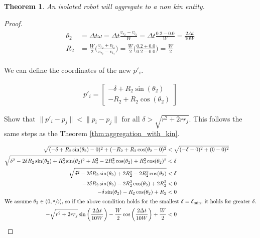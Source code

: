 \documentclass[conference]{IEEEtran}
\newtheorem{theorem}{Theorem}
\begin{document}
  \begin{theorem} \label{thm:aggregation_with_non_kin}
    An isolated robot will aggregate to a non kin entity.
  \end{theorem}
  \begin{proof}
    \begin{align}
      \begin{split} \label{eq:non_kin_theta_and_r}
        \theta_2 &= \Delta t\omega = \Delta t \frac{v_{r_2} - v_{l_2}}{W} = \Delta t \frac{0.2 - 0.0}{W} = \frac{2\Delta t}{10W} \\
        R_2 &= \frac{W}{2}\bigg(\frac{v_{r_2} + v_{l_2}}{v_{r_2} - v_{l_2}}\bigg) = \frac{W}{2}\bigg(\frac{0.2 + 0.0}{0.2 - 0.0}\bigg) = \frac{W}{2}
      \end{split}
    \end{align}

    We can define the coordinates of the new $p'_i$.

    \begin{align} \label{eq:non_kin_coordinates}
      p'_i = \begin{bmatrix}-\delta+R_2\sin(\theta_2) \\ -R_2+R_2\cos(\theta_2)\end{bmatrix}
    \end{align}

    Show that $\lVert p'_i - p_j\rVert < \lVert p_i - p_j\rVert$ for all $\delta > \sqrt{r^2+2rr_j}$. This follows the same steps as the Theorem \ref{thm:aggregation_with_kin}.

    \begin{align*}
      \sqrt{(-\delta+R_2\sin(\theta_2)-0)^2 + (-R_2+R_2\cos(\theta_2-0)^2} &< \sqrt{(-\delta-0)^2 + (0-0)^2} \\
      \sqrt{\delta^2-2\delta R_2\sin(\theta_2) + R_2^2\sin(\theta_2)^2 + R_2^2-2R_2^2\cos(\theta_2)+R_2^2\cos(\theta_2)^2} &< \delta \\
      \sqrt{\delta^2-2\delta R_2\sin(\theta_2) + 2R_2^2-2R_2^2\cos(\theta_2)} &< \delta \\
      -2\delta R_2\sin(\theta_2) - 2R_2^2\cos(\theta_2) + 2R_2^2 &< 0 \\
      -\delta \sin(\theta_2) - R_2\cos(\theta_2) + R_2 &< 0 \\
      \intertext{We assume $\theta_2\in(0,\sfrac{\pi}{2})$, so if the above condition holds for the smallest $\delta=\delta_{\text{min}}$, it holds for greater $\delta$.}
      -\sqrt{r^2+2rr_j}\sin\bigg(\frac{2\Delta t}{10W}\bigg) - \frac{W}{2}\cos\bigg(\frac{2\Delta t}{10W}\bigg) + \frac{W}{2} &< 0
    \end{align*}
  \end{proof}
\end{document}
